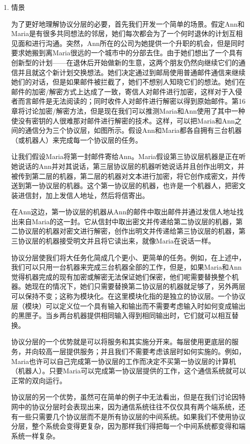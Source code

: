 \begin{enumerate}
	\item 情景

	为了更好地理解协议分层的必要，首先我们开发一个简单的场景。假定Ann和Maria是有很多共同想法的邻居，她们每次都会为了一个何时退休的计划互相见面和进行沟通。突然，Ann所在的公司为她提供一个升职的机会，但是同时要求她搬到离Maria很远的一个城市中的分部去住。由于她们想出了一个具有创新型的计划——在退休后开始做新的生意，这两个朋友仍然向继续它们的通信并且就这个新计划交换想法。她们决定通过到邮局使用普通邮件通信来继续她们的对话，但是如果邮件被拦截了，她们不想别人知晓它们的想法。她们在邮件的加密/解密方式上达成了一致，寄信人对邮件进行加密，这样对于入侵者而言邮件是无法阅读的；同时收件人对邮件进行解密以得到原始邮件。第16章将讨论加密/解密方法，但是现在我们可以推测Maria和Ann使用了其中一种使没有密钥的人很难那对邮件进行解密的技术。这样，可以把Maria和Ann之间的通信分为三个协议层，如图所示。假设Ann和Maria都各自拥有三台机器（或机器人）来完成每一个协议层的任务。

	让我们假设Maria将第一封邮件寄给Ann。Maria假设第三协议层机器是正在听她说话的Ann并对其说话，第三层协议层的机器听她说话并且创作出明文，并被传到第二层的机器，第二层的机器对文本进行加密，将它创作成密文，并传送到第一协议层的机器。这个第一协议层的机器，也许是一个机器人，把密文装进信封，加上发信人地址，然后将信寄出。

	在Ann这边，第一协议层的机器从Ann的邮件中取出邮件并通过发信人地址找出来自Maria的这一封。它从信封中取出密文并传递给第二协议层的机器，第二协议层的机器对密文进行解密，创作出明文并传递给第三协议层的机器，第三协议层的机器接受明文并且将它读出来，就像Maria在说话一样。

	协议分层使我们将大任务化简成几个更小、更简单的任务。例如，在上述中，我们可以只用一台机器来完成三台机器全部的工作，但是，如果Maria和Ann觉得机器完成的现有加密或解密无法保证她们保密，他们呢需要替换整个机器。她现在的情况下，她们只需要替换第二协议层的机器就足够了，另外两层可以保持不变；这称为模块化。在这里模块化指的是独立的协议层。一个协议层（模块）可以定义位一个具有输入和输出而不需要考虑输入时如何变成输出的黑匣子。当乡两台机器提供相同输入得到相同输出时，它们就可以相互替换。

	协议分层的一个优势就是可以将服务和其实施分开来。每层使用更底层的服务，并向较高一层提供服务；并且我们不需要考虑该层时如何实施的。例如，Maria也许可以自己完成第一协议层的工作而决定不买第一协议层的计算机（机器人）。只要Maria可以完成第一协议层提供的工作，这个通信系统就可以正常的双向运行。

	协议层的另一个优势，虽然可在简单的例子中无法看出，但是在我们讨论因特网中的协议分层时会表现出来，因为通信系统往往不仅仅具有两个端系统，还有一些只需要几个协议层而不是所有协议层的中间系统。如果我们不使用协议分层，整个系统会变得更复杂，因为那样我们得把每一个中间系统都变得和端系统一样复杂。


\end{enumerate}
